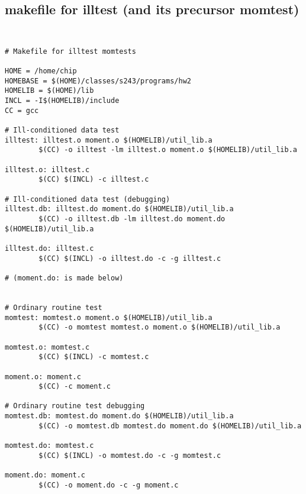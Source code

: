\documentclass{article}
\begin{document}
\subsection{makefile for illtest (and its precursor momtest)}
{\tt
\begin{verbatim}
# Makefile for illtest momtests

HOME = /home/chip
HOMEBASE = $(HOME)/classes/s243/programs/hw2
HOMELIB = $(HOME)/lib
INCL = -I$(HOMELIB)/include
CC = gcc

# Ill-conditioned data test
illtest: illtest.o moment.o $(HOMELIB)/util_lib.a
        $(CC) -o illtest -lm illtest.o moment.o $(HOMELIB)/util_lib.a 

illtest.o: illtest.c
        $(CC) $(INCL) -c illtest.c

# Ill-conditioned data test (debugging)
illtest.db: illtest.do moment.do $(HOMELIB)/util_lib.a
        $(CC) -o illtest.db -lm illtest.do moment.do $(HOMELIB)/util_lib.a

illtest.do: illtest.c
        $(CC) $(INCL) -o illtest.do -c -g illtest.c

# (moment.do: is made below)


# Ordinary routine test
momtest: momtest.o moment.o $(HOMELIB)/util_lib.a
        $(CC) -o momtest momtest.o moment.o $(HOMELIB)/util_lib.a

momtest.o: momtest.c
        $(CC) $(INCL) -c momtest.c

moment.o: moment.c
        $(CC) -c moment.c

# Ordinary routine test debugging
momtest.db: momtest.do moment.do $(HOMELIB)/util_lib.a
        $(CC) -o momtest.db momtest.do moment.do $(HOMELIB)/util_lib.a

momtest.do: momtest.c
        $(CC) $(INCL) -o momtest.do -c -g momtest.c

moment.do: moment.c
        $(CC) -o moment.do -c -g moment.c
\end{verbatim}
}
\end{document}
